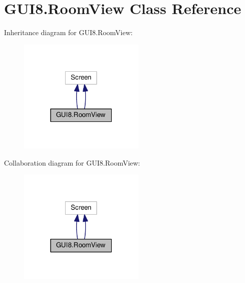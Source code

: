 \hypertarget{classGUI8_1_1RoomView}{}\section{G\+U\+I8.\+Room\+View Class Reference}
\label{classGUI8_1_1RoomView}


Inheritance diagram for G\+U\+I8.\+Room\+View\+:
\nopagebreak
\begin{figure}[H]
\begin{center}
\leavevmode
\includegraphics[width=171pt]{classGUI8_1_1RoomView__inherit__graph}
\end{center}
\end{figure}


Collaboration diagram for G\+U\+I8.\+Room\+View\+:
\nopagebreak
\begin{figure}[H]
\begin{center}
\leavevmode
\includegraphics[width=171pt]{classGUI8_1_1RoomView__coll__graph}
\end{center}
\end{figure}
